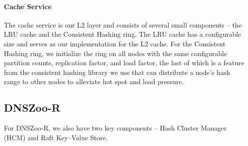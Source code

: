 \documentclass[format=sigconf,nonacm,screen]{acmart}
\newcommand{\dnszoor}{\textsf{DNSZoo-R}}
\begin{document}
\paragraph{\textbf{Cache Service}} The cache service is our L2 layer and consists of several small components -- the LRU cache and the Consistent Hashing ring. The LRU cache has a configurable size and serves as our implementation for the L2 cache. For the Consistent Hashing ring, we initialize the ring on all nodes with the same configurable partition counts, replication factor, and load factor, the last of which is a feature from the consistent hashing library we use that can distribute a node's hash range to other nodes to alleviate hot spot and load pressure.


\subsection{\dnszoor{}} 

For \dnszoor{}, we also have two key components -- Hash Cluster Manager (HCM) and Raft Key--Value Store. 
\end{document}
